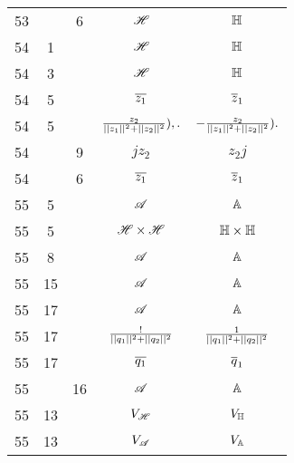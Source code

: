 \documentclass[a4paper,11pt]{article}
\begin{document}
\begin{center}
\begin{tabular}{|c|c|c|c|c|}
    53  & &  6 & $\mathcal{H}$ & $\mathbb{H}$ \\
    54  &  1 & & $\mathcal{H}$ & $\mathbb{H}$ \\
    54  &  3 & & $\mathcal{H}$ & $\mathbb{H}$ \\
    54  &  5 & & $\overline{ z_{ 1 } }$ & $\overline{ z }_{ 1 }$ \\
    54  &  5 & & $\frac{ z_{ 2 } }{ || z_{ 1 } ||^{ 2 }
                 + || z_{ 2 } ||^{ 2 } } ),.$
           & $-\frac{ z_{ 2 } }{ || z_{ 1 } ||^{ 2 }
             + || z_{ 2 } ||^{ 2 } } ).$ \\
    54  & & 9 & $j z_{ 2 }$ & $z_{ 2 } j$ \\
    54  & & 6 & $\overline{ z_{ 1 } }$ & $\overline{ z }_{ 1 }$ \\
    55  &  5 & & $\mathcal{A}$ & $\mathbb{A}$ \\
    55  &  5 & & $\mathcal{H} \times \mathcal{H}$ & $\mathbb{H} \times \mathbb{H}$ \\
    55  &  8 & & $\mathcal{A}$ & $\mathbb{A}$ \\
    55  & 15 & & $\mathcal{A}$ & $\mathbb{A}$ \\
    55  & 17 & & $\mathcal{A}$ & $\mathbb{A}$ \\
    55  & 17 & & $\frac{ ! }{ || q_{ 1 } ||^{ 2 } + || q_{ 2 } ||^{ 2 } }$
           & $\frac{ 1 }{ || q_{ 1 } ||^{ 2 } + || q_{ 2 } ||^{ 2 } }$ \\
    55  & 17 & & $\overline{ q_{ 1 } }$ & $\overline{ q }_{ 1 }$ \\
    55  & & 16 & $\mathcal{A}$ & $\mathbb{A}$ \\
    55  & 13 & & $V_{ \mathcal{H} }$ & $V_{ \mathbb{H} }$ \\
    55  & 13 & & $V_{ \mathcal{A} }$ & $V_{ \mathbb{A} }$ \\
    \hline
  \end{tabular}


\end{center}
\end{document}
